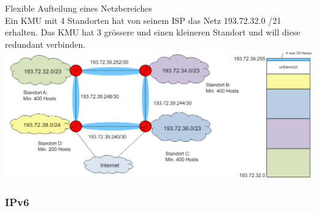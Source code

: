 \begin{example2}{Flexible Aufteilung eines Netzbereiches}\\
    Ein KMU mit 4 Standorten hat von seinem ISP das Netz 193.72.32.0 /21 erhalten. Das KMU hat 3 grössere und einen kleineren Standort und will diese redundant verbinden.\\
        \includegraphics[width=1\linewidth]{images/flexible_aufteilung_netzbereich.png}    
\end{example2}



\subsubsection{IPv6}

